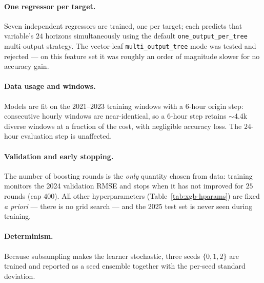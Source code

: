 \documentclass[12pt,a4paper,oneside]{report}
\begin{document}
\paragraph{One regressor per target.}
Seven independent regressors are trained, one per target; each predicts that
variable's $24$ horizons simultaneously using the default
\texttt{one\_output\_per\_tree} multi-output strategy. The vector-leaf
\texttt{multi\_output\_tree} mode was tested and rejected --- on this feature set
it was roughly an order of magnitude slower for no accuracy gain.

\paragraph{Data usage and windows.}
Models are fit on the 2021--2023 training windows with a $6$-hour origin step:
consecutive hourly windows are near-identical, so a $6$-hour step retains
$\sim$4.4k diverse windows at a fraction of the cost, with negligible accuracy
loss. The $24$-hour evaluation step is unaffected.

\paragraph{Validation and early stopping.}
The number of boosting rounds is the \emph{only} quantity chosen from data:
training monitors the 2024 validation RMSE and stops when it has not improved for
$25$ rounds (cap $400$). All other hyperparameters (Table~\ref{tab:xgb-hparams})
are fixed \emph{a priori} --- there is no grid search --- and the 2025 test set is
never seen during training.

\paragraph{Determinism.}
Because subsampling makes the learner stochastic, three seeds $\{0,1,2\}$ are
trained and reported as a seed ensemble together with the per-seed standard
deviation.
\end{document}
